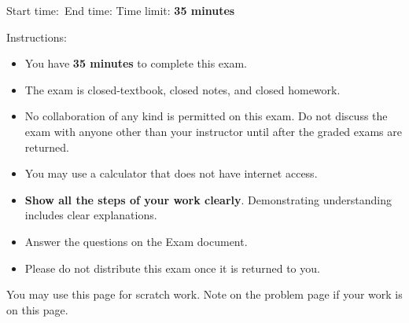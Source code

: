\documentclass{exam}
\begin{document}
\setcounter{page}{0}
\thispagestyle{empty}

{\Large \hrulefill}%

{Start time:\hrulefill\ End time: \hrulefill}
Time limit: \textbf{35 minutes}
\ifprintanswers
\else %

\vspace{1cm}
{\Large Instructions:}
\begin{itemize}

 \item You have \textbf{35 minutes} to complete this exam.

 \item The exam is closed-textbook, closed notes, and closed homework. 
 
 \item No collaboration of any kind is permitted on this exam. Do not discuss the exam with anyone other than your instructor until after the graded exams are returned.
 
 \item You may use a calculator that does not have internet access. 

 \item \textbf{Show all the steps of your work clearly}. Demonstrating understanding includes clear explanations.
 
\item Answer the questions on the Exam document. 


\item Please do not distribute this exam once it is returned to you.



 \end{itemize}


\afterpage{\blankpage}

\clearpage
\fi


\ifprintanswers
\else %

You may use this page for scratch work. Note on the problem page if your work is on this page.
\thispagestyle{empty}
\hbox{}


\checkoddpage{}
\fi
\end{document}
